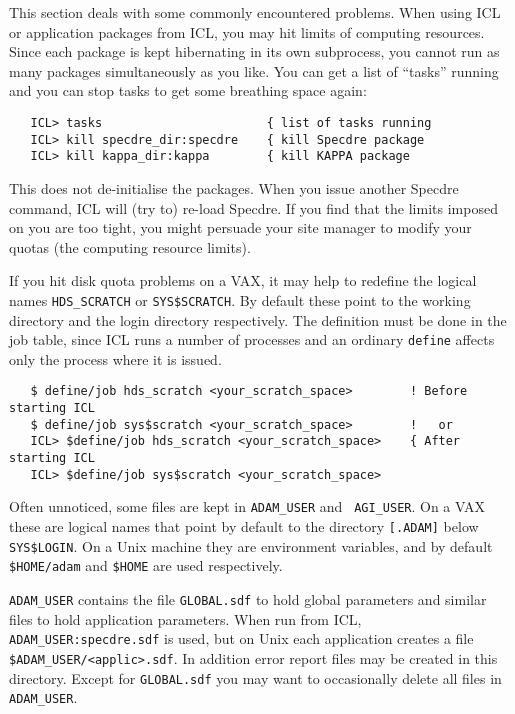 This section deals with some commonly encountered problems. When using ICL or
application packages from ICL, you may hit limits of computing resources. Since
each package is kept hibernating in its own subprocess, you cannot run as many
packages simultaneously as you like. You can get a list of ``tasks'' running
and you can stop tasks to get some breathing space again:

\begin{verbatim}
   ICL> tasks                       { list of tasks running
   ICL> kill specdre_dir:specdre    { kill Specdre package
   ICL> kill kappa_dir:kappa        { kill KAPPA package
\end{verbatim}

This does not de-initialise the packages. When you issue another Specdre
command, ICL will (try to) re-load Specdre. If you find that the limits imposed
on you are too tight, you might persuade your site manager to modify your
quotas (the computing resource limits).

If you hit disk quota problems on a VAX, it may help to redefine the logical
names {\tt HDS\_SCRATCH} or {\tt SYS\$SCRATCH}. By default these point to the
working directory and the login directory respectively. The definition must be
done in the job table, since ICL runs a number of processes and an ordinary
{\tt define} affects only the process where it is issued.

\begin{verbatim}
   $ define/job hds_scratch <your_scratch_space>        ! Before starting ICL
   $ define/job sys$scratch <your_scratch_space>        !   or
   ICL> $define/job hds_scratch <your_scratch_space>    { After starting ICL
   ICL> $define/job sys$scratch <your_scratch_space>
\end{verbatim}

Often unnoticed, some files are kept in {\tt ADAM\_USER} and {\tt
AGI\_USER}. On a VAX these are logical names that point by default to
the directory {\tt [.ADAM]} below {\tt SYS\$LOGIN}. On a Unix machine
they are environment variables, and by default {\tt \$HOME/adam} and
{\tt \$HOME} are used respectively.

{\tt ADAM\_USER} contains the file {\tt GLOBAL.sdf} to hold global parameters
and similar files to hold application parameters. When run from ICL, {\tt
ADAM\_USER:specdre.sdf} is used, but on Unix each application creates a file
{\tt \$ADAM\_USER/<applic>.sdf}. In addition error report files may be created
in this directory. Except for {\tt GLOBAL.sdf} you may want to occasionally
delete all files in {\tt ADAM\_USER}.

